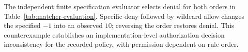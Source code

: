 The independent finite specification evaluator selects denial for both
orders in Table~\ref{tab:matcher-evaluation}. Specific deny followed by
wildcard allow changes the specified $-1$ into an observed $10$; reversing
the order restores denial. This counterexample establishes an
implementation-level authorization decision inconsistency for the recorded
policy, with permission dependent on rule order.
